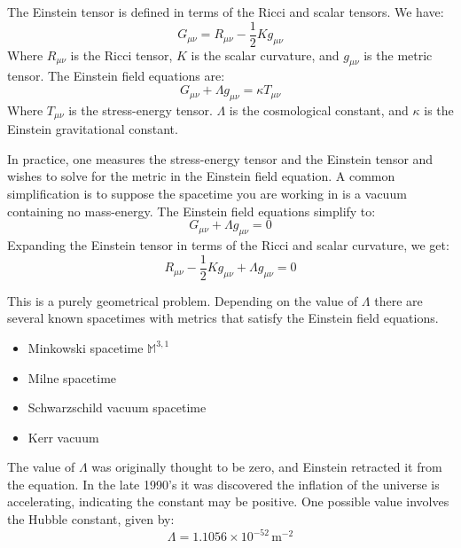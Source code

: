 \documentclass{beamer}
\begin{document}
    \begin{frame}
        The Einstein tensor is defined in terms of the Ricci and scalar tensors.
        We have:
        \begin{equation}
            G_{\mu\nu}=R_{\mu\nu}-\frac{1}{2}Kg_{\mu\nu}
        \end{equation}
        Where $R_{\mu\nu}$ is the Ricci tensor, $K$ is the scalar curvature,
        and $g_{\mu\nu}$ is the metric tensor. The Einstein field equations are:
        \begin{equation}
            G_{\mu\nu}+\Lambda{g}_{\mu\nu}=\kappa{T}_{\mu\nu}
        \end{equation}
        Where $T_{\mu\nu}$ is the stress-energy tensor. $\Lambda$ is the
        cosmological constant, and $\kappa$ is the Einstein gravitational
        constant.
    \end{frame}
    \begin{frame}
        In practice, one measures the stress-energy tensor and the Einstein
        tensor and wishes to solve for the metric in the Einstein field
        equation. A common simplification is to suppose the spacetime you are
        working in is a vacuum containing no mass-energy. The Einstein field
        equations simplify to:
        \begin{equation}
            G_{\mu\nu}+\Lambda{g}_{\mu\nu}=0
        \end{equation}
        Expanding the Einstein tensor in terms of the Ricci and scalar
        curvature, we get:
        \begin{equation}
            R_{\mu\nu}-\frac{1}{2}Kg_{\mu\nu}+\Lambda{g}_{\mu\nu}=0
        \end{equation}
    \end{frame}
    \begin{frame}
        This is a purely geometrical problem. Depending on the value of
        $\Lambda$ there are several known spacetimes with metrics that satisfy
        the Einstein field equations.
        \begin{itemize}
            \item Minkowski spacetime $\mathbb{M}^{3,1}$
            \item Milne spacetime
            \item Schwarzschild vacuum spacetime
            \item Kerr vacuum
        \end{itemize}
        The value of $\Lambda$ was originally thought to be zero, and Einstein
        retracted it from the equation. In the late 1990's it was discovered
        the inflation of the universe is accelerating, indicating the constant
        may be positive. One possible value involves the Hubble constant, given
        by:
        \begin{equation}
            \Lambda=1.1056\times{10}^{-52}\,\textrm{m}^{-2}
        \end{equation}
    \end{frame}
\end{document}

